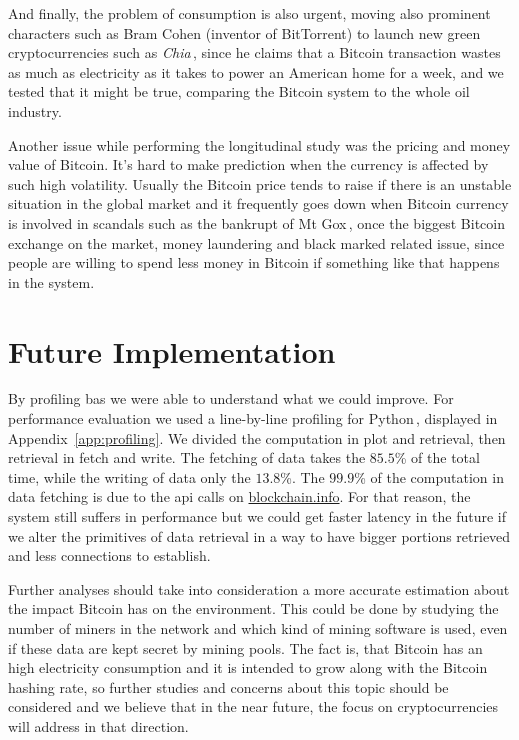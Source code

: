 \documentclass[USenglish]{uit-thesis}
\begin{document}
And finally, the problem of consumption is also
urgent, moving also prominent characters such as
Bram Cohen (inventor of BitTorrent) to launch
new green cryptocurrencies such as \emph{Chia}\,\cite{chia},
since he claims that
a Bitcoin transaction wastes as much as electricity
as it takes to power an American home
for a week, and we tested that it might be true,
comparing the Bitcoin system to the whole
oil industry.

Another issue while performing the longitudinal
study was the pricing and money value of Bitcoin.
It's hard to make prediction when the
currency is affected by such
high volatility. Usually the Bitcoin
price tends to raise if there is an unstable
situation in the global market and it frequently
goes down when Bitcoin currency is involved
in scandals such as the bankrupt of Mt Gox\,\cite{mtgox_news},
once the biggest Bitcoin exchange on the market,
money laundering and black marked related
issue, since people are willing to spend
less money in Bitcoin if something like that happens
in the system.

\section{Future Implementation}
\label{sec:future_implementation}
By profiling \gls{bas} we were able to understand what
we could improve. For performance evaluation
we used a line-by-line profiling for
Python\,\cite{line_profiler}, displayed
in Appendix~\ref{app:profiling}.
We divided the computation in plot and
retrieval, then retrieval in fetch and write.
The fetching of data takes the $85.5$\%
of the total time, while
the writing of data only the $13.8$\%.
The $99.9$\% of the computation in
data fetching is due to the \gls{api} calls
on \url{blockchain.info}. For that reason, the system
still suffers in performance but
we could get faster latency in the future
if we alter the primitives of data retrieval
in a way to have bigger portions retrieved
and less connections to establish.

Further analyses should take into consideration a more accurate
estimation about the impact Bitcoin has on the environment.
This could be done by studying
the number of miners in the network and which kind of
mining software is used, even if these data are kept
secret by mining pools.
The fact is, that Bitcoin has an high
electricity consumption and it is intended to grow along
with the Bitcoin hashing rate, so further studies and
concerns about this topic should be considered and we believe that
in the near future, the focus on cryptocurrencies
will address in that direction.
\end{document}
